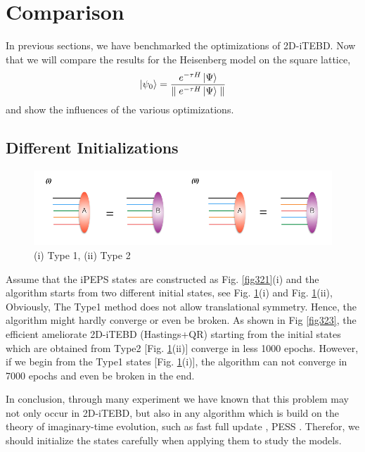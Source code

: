 \section{Comparison} 
\label{Comparison}

In previous sections, we have benchmarked the optimizations of 2D-iTEBD. Now that we will compare the results for the Heisenberg model on the square lattice,
\begin{align}
	\label{mapgroud}
	\Ket{\psi_0} = \frac{e^{-\tau H} \Ket{\Psi}}{\parallel e^{-\tau H} \Ket{\Psi}\parallel}
\end{align}
and show the influences of the various optimizations.

\subsection{Different Initializations}

\begin{figure}[ht]
	\centering
	\includegraphics[width=1.00\textwidth]{figures/fig322.png}
	\caption[Different methods to initialize the states]{(i) Type 1, (ii) Type 2}
	\label{fig322}
\end{figure}

Assume that the iPEPS states are constructed as Fig. \ref{fig321}(i) and the algorithm starts from two different initial states, see Fig. \ref{fig322}(i) and Fig. \ref{fig322}(ii), Obviously, The Type1 method does not allow translational symmetry. Hence, the algorithm might hardly converge or even be broken. As shown in Fig \ref{fig323}, the efficient ameliorate 2D-iTEBD (Hastings+QR) starting from the initial states which are obtained from Type2 [Fig. \ref{fig322}(ii)] converge in less 1000 epochs. However, if we begin from the Type1 states [Fig. \ref{fig322}(i)], the algorithm can not converge in 7000 epochs and even be broken in the end. 

In conclusion, through many experiment we have known that this problem may not only occur in 2D-iTEBD, but also in any algorithm which is build on the theory of imaginary-time evolution, such as fast full update \cite{}, PESS \cite{}. Therefor, we should initialize the states carefully when applying them to study the models.

